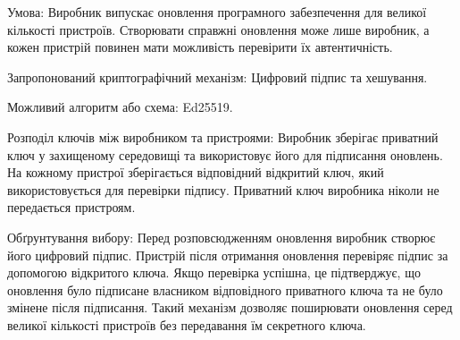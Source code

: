 Умова: Виробник випускає оновлення програмного забезпечення для великої кількості пристроїв. Створювати справжні оновлення може 
лише виробник, а кожен пристрій повинен мати можливість перевірити їх автентичність.

Запропонований криптографічний механізм: Цифровий підпис та хешування.

Можливий алгоритм або схема: Ed25519.

Розподіл ключів між виробником та пристроями: Виробник зберігає приватний ключ у захищеному середовищі та використовує 
його для підписання оновлень. На кожному пристрої зберігається відповідний відкритий ключ, який використовується для перевірки підпису. 
Приватний ключ виробника ніколи не передається пристроям.

Обґрунтування вибору: Перед розповсюдженням оновлення виробник створює його цифровий підпис. Пристрій після отримання оновлення 
перевіряє підпис за допомогою відкритого ключа. Якщо перевірка успішна, це підтверджує, що оновлення було підписане власником відповідного 
приватного ключа та не було змінене після підписання. Такий механізм дозволяє поширювати оновлення серед великої кількості пристроїв без передавання їм секретного ключа.
